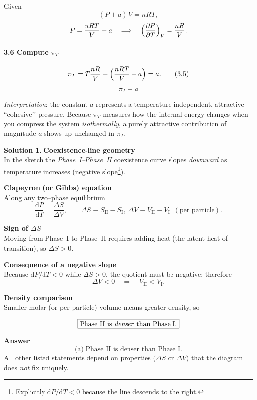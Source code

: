 \documentclass[12pt]{article}
\theoremstyle{definition} %
\newtheorem{solution}{Solution}
\theoremstyle{plain} %
\begin{document}
Given
\[
\boxed{(P+a)\,V = nRT},
\]
\[
P = \frac{nRT}{V} - a
     \quad\Longrightarrow\quad
\Bigl(\frac{\partial P}{\partial T}\Bigr)_{V}
     = \frac{nR}{V}.
\]

\paragraph{3.6 Compute $\pi_{T}$}

\[
\pi_{T}
  = T\frac{nR}{V}
    -\Bigl(\frac{nRT}{V} - a\Bigr)
  = a.
\tag{3.5}
\]

\[
\boxed{\;\pi_{T}=a\;}
\]

\emph{Interpretation}:  
the constant \(a\) represents a temperature‑independent, attractive “cohesive’’ pressure.  
Because \(\pi_{T}\) measures how the internal energy changes when you compress the system \emph{isothermally}, a purely attractive contribution of magnitude \(a\) shows up unchanged in \(\pi_{T}\).
\begin{solution}
  \textbf{Coexistence‐line geometry}\\
  In the sketch the \emph{Phase I–Phase II} coexistence curve slopes \emph{downward} as
  temperature increases (negative slope\footnote{%
  Explicitly $\mathrm{d}P/\mathrm{d}T<0$ because the line descends to the
  right.}).
  
  \bigskip
  \textbf{Clapeyron (or Gibbs) equation}\\
  Along any two–phase equilibrium
  \[
  \frac{\mathrm{d}P}{\mathrm{d}T}
     =\frac{\Delta S}{\Delta V},
     \qquad
     \Delta S \equiv S_{\text{II}}-S_{\text{I}},\;
     \Delta V \equiv V_{\text{II}}-V_{\text{I}}
     \;\;( \text{per particle} ).
  \]
  
  \bigskip
  \textbf{Sign of $\Delta S$}\\
  Moving from Phase I to Phase II requires adding heat (the latent heat of
  transition), so $\Delta S>0$.
  
  \bigskip
  \textbf{Consequence of a negative slope}\\
  Because $\mathrm{d}P/\mathrm{d}T<0$ while $\Delta S>0$,
  the quotient must be negative; therefore
  \[
  \Delta V < 0
  \quad\Longrightarrow\quad
  V_{\text{II}}<V_{\text{I}}.
  \]
  
  \bigskip
  \textbf{Density comparison}\\
  Smaller molar (or per‐particle) volume means greater density, so
  
  \[
  \boxed{\text{Phase II is \textit{denser} than Phase I.}}
  \]
  
  \bigskip
  \textbf{Answer}\\
  \[
  \text{(a) Phase II is denser than Phase I.}
  \]
  All other listed statements depend on properties (\(\Delta S\) or
  \(\Delta V\)) that the diagram does \emph{not} fix uniquely.
  \end{solution}
\end{document}
